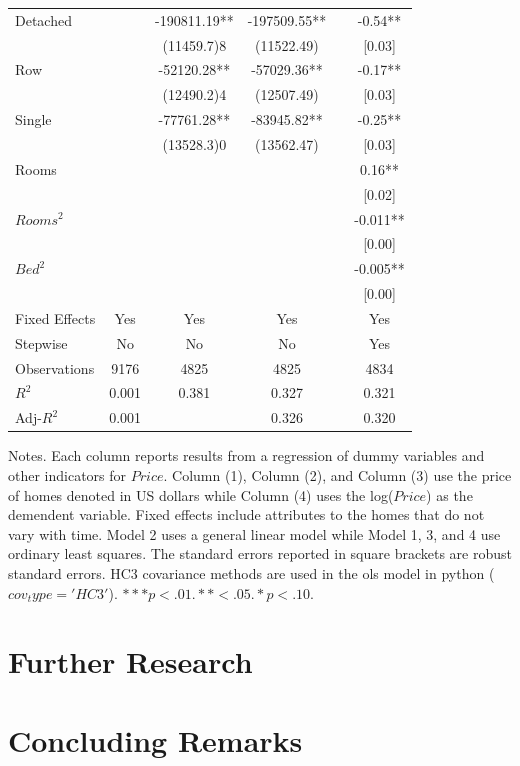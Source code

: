 \documentclass[12pt]{report}
\begin{document}
\begin{table}[h!]
\begin{threeparttable}
\begin{tabular}{lccccc}
Detached&	&	-190811.19\footnotesize***& -197509.55\footnotesize***&&	-0.54\footnotesize*** \\
&	&	\footnotesize(11459.7)8&	\footnotesize(11522.49)&&	\footnotesize[0.03] \\
Row&	 &	-52120.28\footnotesize***&	-57029.36\footnotesize***&& 	-0.17\footnotesize*** \\
&	&	\footnotesize(12490.2)4&	\footnotesize(12507.49)&&	\footnotesize[0.03] \\
Single&	&	-77761.28\footnotesize***&	-83945.82\footnotesize***&&	-0.25\footnotesize*** \\
&	&	\footnotesize(13528.3)0&	\footnotesize(13562.47)&&	\footnotesize[0.03]\\
Rooms&	&	&	&&	0.16\footnotesize***\\
&	&	&	&&	\footnotesize[0.02] \\
$Rooms^2$&	&	&	&&	-0.011\footnotesize*** \\
&	&	&	&&	\footnotesize[0.00] \\
$Bed^2$&	&	&	&&	-0.005\footnotesize*** \\
&	&	&&	&	\footnotesize[0.00] \\
Fixed Effects &       Yes&             Yes &                  Yes &  &                       Yes    \\ [0.5ex]
Stepwise &       No&             No &                   No &  &                      Yes    \\ [0.5ex]
Observations&            9176 &           4825&                  4825   &&                         4834      \\ [0.5ex]
$R^2$ &                     0.001 &          0.381&                   0.327 &&                      0.321 \\ [0.5ex]
Adj-$R^2$&                 0.001&        &                  0.326 &  &                   0.320   \\ [0.5ex]
\hline
\bottomrule
\end{tabular}
\begin{tablenotes}
  
 \item \footnotesize{Notes. Each column reports results from a regression of dummy variables and other indicators for $Price$. Column (1),  Column (2), and Column (3) use the price of homes denoted in US dollars while Column (4) uses the log($Price$) as the demendent variable. Fixed effects include attributes to the homes that do not vary with time. Model 2 uses a general linear model while Model 1, 3, and 4 use ordinary least squares. The standard errors reported in square brackets  are robust standard errors. HC3 covariance methods are used in the ols model in python ($cov_type='HC3'$). $***p<.01. **<.05. *p<.10.$}

\end{tablenotes}
\label{table:2}
\end{threeparttable}
\end{table}
\clearpage


\section*{Further Research}
\section*{Concluding Remarks}
\end{document}
